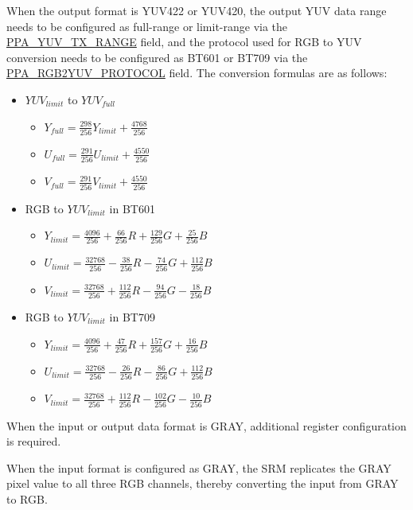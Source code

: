 \documentclass[main\_\_EN.tex]{subfiles}
\begin{document}
When the output format is YUV422 or YUV420, the output YUV data range needs to be configured as full-range or limit-range via the \hyperref[fielddesc:PPAYUVTXRANGE]{PPA\_YUV\_TX\_RANGE} field, and the protocol used for RGB to YUV conversion needs to be configured as BT601 or BT709 via the \hyperref[fielddesc:PPARGB2YUVPROTOCOL]{PPA\_RGB2YUV\_PROTOCOL} field. The conversion formulas are as follows:

\begin{itemize}
    \item $YUV_{limit}$ to $YUV_{full}$
        \begin{itemize}
            \item $Y_{full} = \frac{298}{256} Y_{limit} + \frac{4768}{256}$
            \item $U_{full} = \frac{291}{256} U_{limit} + \frac{4550}{256}$
            \item $V_{full} = \frac{291}{256} V_{limit} + \frac{4550}{256}$
        \end{itemize}
    \item RGB to $YUV_{limit}$ in BT601
        \begin{itemize}
            \item $Y_{limit} = \frac{4096}{256} + \frac{66}{256}R + \frac{129}{256}G + \frac{25}{256}B$
            \item $U_{limit} = \frac{32768}{256} - \frac{38}{256}R - \frac{74}{256}G + \frac{112}{256}B$
            \item $V_{limit} = \frac{32768}{256} + \frac{112}{256}R - \frac{94}{256}G - \frac{18}{256}B$
        \end{itemize}
    \item RGB to $YUV_{limit}$ in BT709
        \begin{itemize}
            \item $Y_{limit} = \frac{4096}{256} + \frac{47}{256}R + \frac{157}{256}G + \frac{16}{256}B$
            \item $U_{limit} = \frac{32768}{256} - \frac{26}{256}R - \frac{86}{256}G + \frac{112}{256}B$
            \item $V_{limit} = \frac{32768}{256} + \frac{112}{256}R - \frac{102}{256}G - \frac{10}{256}B$
        \end{itemize}
\end{itemize}

When the input or output data format is GRAY, additional register configuration is required.

When the input format is configured as GRAY, the SRM replicates the GRAY pixel value to all three RGB channels, thereby converting the input from GRAY to RGB.
\end{document}
